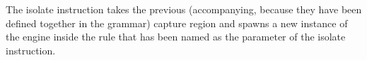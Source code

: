 The isolate instruction takes the previous (accompanying, because they
have been defined together in the grammar) capture region and spawns
a new instance of the engine inside the rule that has been named as
the parameter of the isolate instruction.
